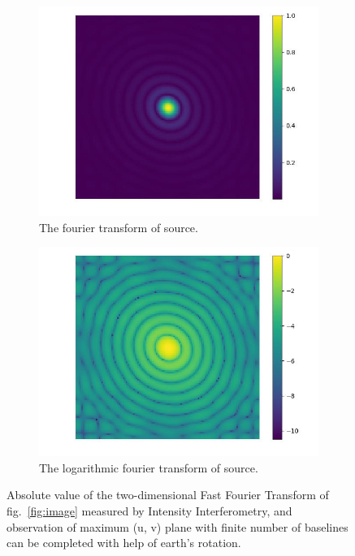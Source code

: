 \documentclass[fleqn,usenatbib,twocolumn]{mnras}
\begin{document}
\begin{figure}
	\centering
	\begin{subfigure}{0.5\linewidth}
		\includegraphics[width=\linewidth]{../fig/ft/ft.jpg}
		\caption{The fourier transform of source.}
	\end{subfigure}\hfill
	\begin{subfigure}{0.5\linewidth}
		\includegraphics[width=\linewidth]{../fig/ft/ft_log.jpg}
		\caption{The logarithmic fourier transform of source.}
	\end{subfigure}
	\caption{Absolute value of the two-dimensional Fast Fourier Transform of fig.~\ref{fig:image} measured by Intensity Interferometry, and observation of maximum (u, v) plane with finite number of baselines can be completed with help of earth's rotation.}
	\label{fig:ft}
\end{figure}
\end{document}
